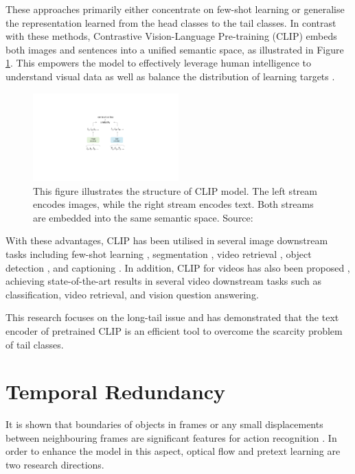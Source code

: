 These approaches primarily either concentrate on few-shot learning or generalise the representation learned from the head classes to the tail classes. In contrast with these methods, Contrastive Vision-Language Pre-training (CLIP) \parencite{radford2021learning} embeds both images and sentences into a unified semantic space, as illustrated in Figure \ref{fig:clipstructure}. This empowers the model to effectively leverage human intelligence to understand visual data as well as balance the distribution of learning targets \parencite{ma2022x}. 

\begin{figure}[ht]
    \centering
    \includegraphics[width=0.5\textwidth]{assets/charts_rw/CLIP}
    \caption[Illustration of CLIP Model Structure]{This figure illustrates the structure of CLIP model. The left stream encodes images, while the right stream encodes text. Both streams are embedded into the same semantic space. Source: \parencite{radford2021learning}}
    \label{fig:clipstructure}
\end{figure}

With these advantages, CLIP has been utilised in several image downstream tasks including few-shot learning \parencite{zhang2022tip}, segmentation \parencite{wang2022cris}, video retrieval \parencite{ma2022x}, object detection \parencite{lin2023gridclip}, and captioning \parencite{mokady2021clipcap}. In addition, CLIP for videos has also been proposed \parencite{xu-etal-2021-videoclip, wang2022internvideo}, achieving state-of-the-art results in several video downstream tasks such as classification, video retrieval, and vision question answering.

This research focuses on the long-tail issue and has demonstrated that the text encoder of pretrained CLIP is an efficient tool to overcome the scarcity problem of tail classes.


\section{Temporal Redundancy}
It is shown that boundaries of objects in frames or any small displacements between neighbouring frames are significant features for action recognition \parencite{10.1007/978-3-030-12939-2_20}. In order to enhance the model in this aspect, optical flow and pretext learning are two research directions. 

